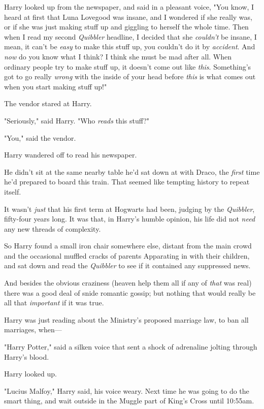 Harry looked up from the newspaper, and said in a pleasant voice, "You know, I
heard at first that Luna Lovegood was insane, and I wondered if she really was,
or if she was just making stuff up and giggling to herself the whole time. Then
when I read my second \emph{Quibbler} headline, I decided that she
\emph{couldn’t} be insane, I mean, it can’t be \emph{easy} to make this stuff
up, you couldn’t do it by \emph{accident}. And \emph{now} do you know what I
think? I think she must be mad after all. When ordinary people try to make
stuff up, it doesn’t come out like \emph{this}. Something’s got to go really
\emph{wrong} with the inside of your head before \emph{this} is what comes out
when you start making stuff up!"

The vendor stared at Harry.

"Seriously," said Harry. "Who \emph{reads} this stuff?"

"You," said the vendor.

Harry wandered off to read his newspaper.

He didn’t sit at the same nearby table he’d sat down at with Draco, the
\emph{first} time he’d prepared to board this train. That seemed like tempting
history to repeat itself.

It wasn’t \emph{just} that his first term at Hogwarts had been, judging by the
\emph{Quibbler}, fifty-four years long. It was that, in Harry’s humble opinion,
his life did not \emph{need} any new threads of complexity.

So Harry found a small iron chair somewhere else, distant from the main crowd
and the occasional muffled cracks of parents Apparating in with their children,
and sat down and read the \emph{Quibbler} to see if it contained any suppressed
news.

And besides the obvious craziness (heaven help them all if any of \emph{that}
was real) there was a good deal of snide romantic gossip; but nothing that
would really be all that \emph{important} if it was true.

Harry was just reading about the Ministry’s proposed marriage law, to ban all
marriages, when—

"Harry Potter," said a silken voice that sent a shock of adrenaline jolting
through Harry’s blood.

Harry looked up.

"Lucius Malfoy," Harry said, his voice weary. Next time he was going to do the
smart thing, and wait outside in the Muggle part of King’s Cross until 10:55am.

